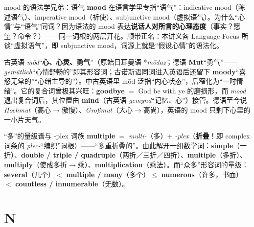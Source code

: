 \documentclass[../main.tex]{subfiles}
\begin{document}
\begin{gram}{mood 的语法学兄弟：语气}
\textbf{mood} 在语言学里专指“语气”：indicative mood（陈述语气）、imperative mood（祈使）、subjunctive mood（虚拟语气）。为什么“心情”与“语气”同词？因为语法的 mood 表达\textbf{说话人对所言的心理态度}（事实？愿望？命令？）——同一词根的两层开花。顺带正名：本讲义各 Language Focus 所谈“虚拟语气”，即 subjunctive mood，词源上就是“假设心情”的语法化。
\end{gram}

\begin{origin}
古英语 \textit{mōd}“\textbf{心、心灵、勇气}”（原始日耳曼语 *\textit{mōdaz}；德语 \textbf{Mut}“勇气”——\textit{gemütlich}“心情舒畅的”即其形容词；古诺斯语同词进入英语后还留下 \textbf{moody}“喜怒无常的”“心绪主导的”）。中古英语里 mōd 泛指“内心状态”，后窄化为“一时情绪”。它的复合词曾极其兴旺：\textbf{goodbye} $=$ God be with ye 的磨损形，而 \textit{mood} 退出复合词后，其位置由 \textbf{mind}（古英语 \textit{gemynd}“记忆、心”）接管。德语至今说 \textit{Hochmut}（高心$\to$傲慢）、\textit{Großmut}（大心$\to$高尚），英语的 mood 只剩下心里的一小片天气。
\end{origin}



\begin{gram}{“多”的量级谱与 -plex 词族}
\textbf{multiple} $=$ \textit{multi-}（多）$+$ \textit{-plex}（\textbf{折叠}！即 complex 词条的 \textit{plec-}“编织”词根）——“多重折叠的”。由此解开一组数学词：\textbf{simple}（一折）、\textbf{double / triple / quadruple}（两折／三折／四折）、\textbf{multiple}（多折）、\textbf{multiply}（使成多折$\to$乘）、\textbf{multiplication}（乘法）。而“众多”形容词的量级：\textbf{several}（几个）$<$ \textbf{multiple / many}（多个）$\le$ \textbf{numerous}（许多，书面）$<$ \textbf{countless / innumerable}（无数）。
\end{gram}

\section{N}

\end{document}
